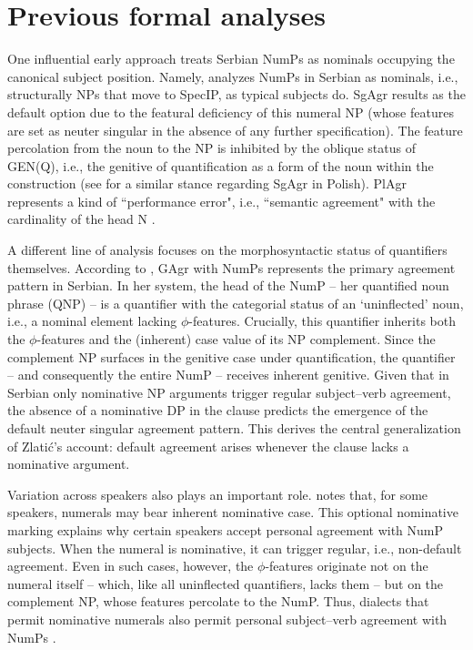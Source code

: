 \documentclass[output=paper,colorlinks,citecolor=brown
]{langscibook}
\begin{document}
\section{Previous formal analyses} \label{sect:previous-analyses}

One influential early approach treats Serbian NumPs as nominals occupying the canonical subject position. Namely, \citet{Franks1995} analyzes NumPs in Serbian as nominals, i.e., structurally NPs that move to SpecIP, as typical subjects do. SgAgr results as the default option due to the featural deficiency of this numeral NP (whose features are set as neuter singular in the absence of any further specification). The feature percolation from the noun to the NP is inhibited by the oblique status of GEN(Q), i.e., the genitive of quantification as a form of the noun within the construction (see \citealt{Matushansky2018} for a similar stance regarding SgAgr in Polish). PlAgr represents a kind of “performance error", i.e., “semantic agreement" with the cardinality of the head N \citep[114]{Franks1995}. 

A different line of analysis focuses on the morphosyntactic status of quantifiers themselves. According to \citet[147]{Zlatic1997}, GAgr with NumPs represents the primary agreement pattern in Serbian. In her system, the head of the NumP -- her quantified noun phrase (QNP) -- is a quantifier with the categorial status of an ‘uninflected’ noun, i.e., a nominal element lacking $\phi$-features. Crucially, this quantifier inherits both the $\phi$-features and the (inherent) case value of its NP complement. Since the complement NP surfaces in the genitive case under quantification, the quantifier -- and consequently the entire NumP -- receives inherent genitive. Given that in Serbian only nominative NP arguments trigger regular subject--verb agreement, the absence of a nominative DP in the clause predicts the emergence of the default neuter singular agreement pattern. This derives the central generalization of Zlatić’s account: default agreement arises whenever the clause lacks a nominative argument.

Variation across speakers also plays an important role. \citeauthor{Zlatic1997} notes that, for some speakers, numerals may bear inherent nominative case. This optional nominative marking explains why certain speakers accept personal agreement with NumP subjects. When the numeral is nominative, it can trigger regular, i.e., non-default agreement. Even in such cases, however, the $\phi$-features originate not on the numeral itself -- which, like all uninflected quantifiers, lacks them -- but on the complement NP, whose features percolate to the NumP. Thus, dialects that permit nominative numerals also permit personal subject--verb agreement with NumPs \citep{Zlatic1997}.
\end{document}
